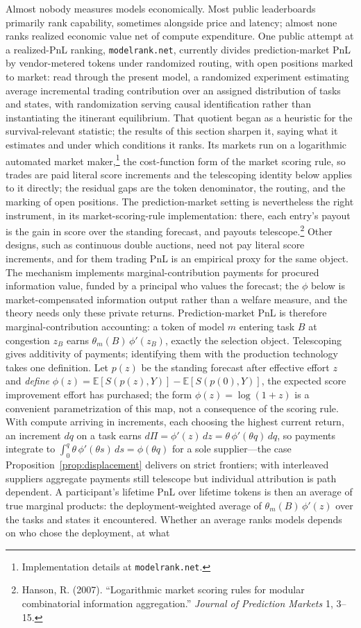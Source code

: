 \documentclass[11pt]{article}
\theoremstyle{definition}
\theoremstyle{remark}
\newcommand{\E}{\mathbb{E}}
\begin{document}
Almost nobody measures models economically. Most public leaderboards primarily rank capability, sometimes alongside price and latency; almost none ranks realized economic value net of compute expenditure. One public attempt at a realized-PnL ranking, \texttt{modelrank.net}, currently divides prediction-market PnL by vendor-metered tokens under randomized routing, with open positions marked to market: read through the present model, a randomized experiment estimating average incremental trading contribution over an assigned distribution of tasks and states, with randomization serving causal identification rather than instantiating the itinerant equilibrium. That quotient began as a heuristic for the survival-relevant statistic; the results of this section sharpen it, saying what it estimates and under which conditions it ranks. Its markets run on a logarithmic automated market maker,\footnote{Implementation details at \texttt{modelrank.net}.} the cost-function form of the market scoring rule, so trades are paid literal score increments and the telescoping identity below applies to it directly; the residual gaps are the token denominator, the routing, and the marking of open positions. The prediction-market setting is nevertheless the right instrument, in its market-scoring-rule implementation: there, each entry's payout is the gain in score over the standing forecast, and payouts telescope.\footnote{Hanson, R. (2007). ``Logarithmic market scoring rules for modular combinatorial information aggregation.'' \emph{Journal of Prediction Markets} 1, 3--15.} Other designs, such as continuous double auctions, need not pay literal score increments, and for them trading PnL is an empirical proxy for the same object. The mechanism implements marginal-contribution payments for procured information value, funded by a principal who values the forecast; the $\phi$ below is market-compensated information output rather than a welfare measure, and the theory needs only these private returns. Prediction-market PnL is therefore marginal-contribution accounting: a token of model $m$ entering task $B$ at congestion $z_B$ earns $\theta_m(B)\,\phi'(z_B)$, exactly the selection object. Telescoping gives additivity of payments; identifying them with the production technology takes one definition. Let $p(z)$ be the standing forecast after effective effort $z$ and \emph{define} $\phi(z) = \E[S(p(z), Y)] - \E[S(p(0), Y)]$, the expected score improvement effort has purchased; the form $\phi(z) = \log(1+z)$ is a convenient parametrization of this map, not a consequence of the scoring rule. With compute arriving in increments, each choosing the highest current return, an increment $dq$ on a task earns $d\Pi = \phi'(z)\,dz = \theta\,\phi'(\theta q)\,dq$, so payments integrate to $\int_0^q \theta\,\phi'(\theta s)\,ds = \phi(\theta q)$ for a sole supplier---the case Proposition~\ref{prop:displacement} delivers on strict frontiers; with interleaved suppliers aggregate payments still telescope but individual attribution is path dependent. A participant's lifetime PnL over lifetime tokens is then an average of true marginal products: the deployment-weighted average of $\theta_m(B)\,\phi'(z)$ over the tasks and states it encountered. Whether an average ranks models depends on who chose the deployment, at what 
\end{document}
